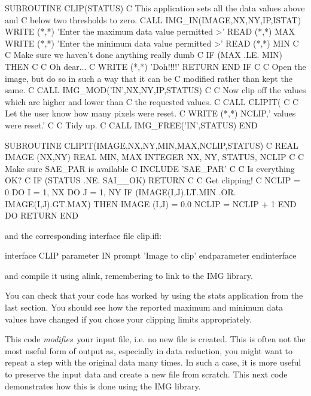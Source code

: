 \documentclass[11pt,nolof]{starlink}
\begin{document}
\begin{small}
\begin{terminalv}
       SUBROUTINE CLIP(STATUS)
C This application sets all the data values above and
C below two thresholds to zero.
       CALL IMG_IN(IMAGE,NX,NY,IP,ISTAT)
       WRITE (*,*) 'Enter the maximum data value permitted >'
       READ (*,*) MAX
       WRITE (*,*) 'Enter the minimum data value permitted >'
       READ (*,*) MIN
C
C Make sure we haven't done anything really dumb
C
       IF (MAX .LE. MIN) THEN
C
C Oh dear...
C
         WRITE (*,*) 'Doh!!!!'
         RETURN
       END IF
C
C Open the image, but do so in such a way that it can be
C modified rather than kept the same.
C
       CALL IMG_MOD('IN',NX,NY,IP,STATUS)
C
C Now clip off the values which are higher and lower than
C the requested values.
C
       CALL CLIPIT(%
C
C Let the user know how many pixels were reset.
C
       WRITE (*,*) NCLIP,' values were reset.'
C
C Tidy up.
C
       CALL IMG_FREE('IN',STATUS)
       END

       SUBROUTINE CLIPIT(IMAGE,NX,NY,MIN,MAX,NCLIP,STATUS)
C
       REAL IMAGE (NX,NY)
       REAL MIN, MAX
       INTEGER NX, NY, STATUS, NCLIP
C
C Make sure SAE_PAR is available
C
       INCLUDE 'SAE_PAR'
C
C Is everything OK?
C
       IF (STATUS .NE. SAI__OK) RETURN
C
C Get clipping!
C
       NCLIP = 0
       DO I = 1, NX
         DO J = 1, NY
           IF (IMAGE(I,J).LT.MIN .OR. IMAGE(I,J).GT.MAX) THEN
           IMAGE (I,J) = 0.0
           NCLIP = NCLIP + 1
         END DO
       RETURN
       END
\end{terminalv}
\end{small}

and the corresponding interface file \textsf{clip.ifl}:

\begin{small}
\begin{terminalv}
interface CLIP
  parameter IN
    prompt 'Image to clip'
  endparameter
endinterface
\end{terminalv}
\end{small}

and compile it using \textsf{alink}, remembering to link to the IMG library.

You can check that your code has worked by using the \textsf{stats} application
from the last section. You should see how the reported maximum and
minimum data values have changed if you chose your clipping limits
appropriately.

This code \emph{modifies}\, your input file, i.e. no new file is created. This
is often not the most useful form of output as, especially in data
reduction, you might want to repeat a step with the original data many
times. In such a case, it is more useful to preserve the input data and
create a new file from scratch. This next code demonstrates how this is
done using the \textsf{IMG} library.
\end{document}
